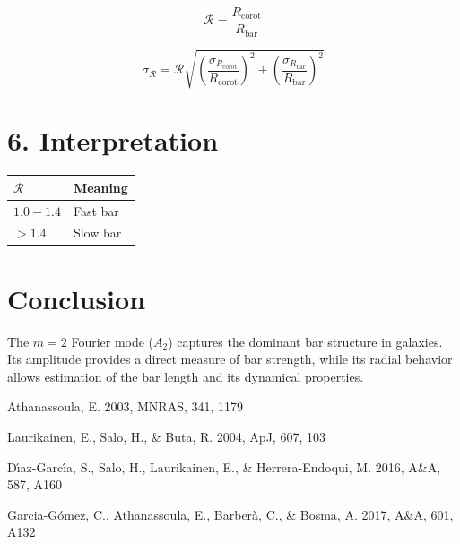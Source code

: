 \documentclass[11pt]{article}
\begin{document}
\begin{equation}
\mathcal{R} = \frac{R_{\text{corot}}}{R_{\text{bar}}}
\end{equation}

\begin{equation}
\sigma_{\mathcal{R}} =
\mathcal{R} \sqrt{
\left(\frac{\sigma_{R_{\text{corot}}}}{R_{\text{corot}}}\right)^2 +
\left(\frac{\sigma_{R_{\text{bar}}}}{R_{\text{bar}}}\right)^2
}
\end{equation}

\section*{6. Interpretation}

\begin{tabular}{ll}
\hline
$\mathcal{R}$ & Meaning \\
\hline
$1.0 - 1.4$ & Fast bar \\
$> 1.4$ & Slow bar \\
\hline
\end{tabular}

\section*{Conclusion}

The $m=2$ Fourier mode ($A_2$) captures the dominant bar structure in galaxies. 
Its amplitude provides a direct measure of bar strength, while its radial behavior 
allows estimation of the bar length and its dynamical properties.

\begin{thebibliography}{}

            Athanassoula, E. 2003, MNRAS, 341, 1179

Laurikainen, E., Salo, H., \& Buta, R. 2004, ApJ, 607, 103

D{\'\i}az-Garc{\'\i}a, S., Salo, H., Laurikainen, E., \& Herrera-Endoqui, M. 2016, A\&A, 587, A160

Garcia-G{\'o}mez, C., Athanassoula, E., Barber{\`a}, C., \& Bosma, A. 2017, A\&A, 601, A132

\end{thebibliography}
\end{document}
